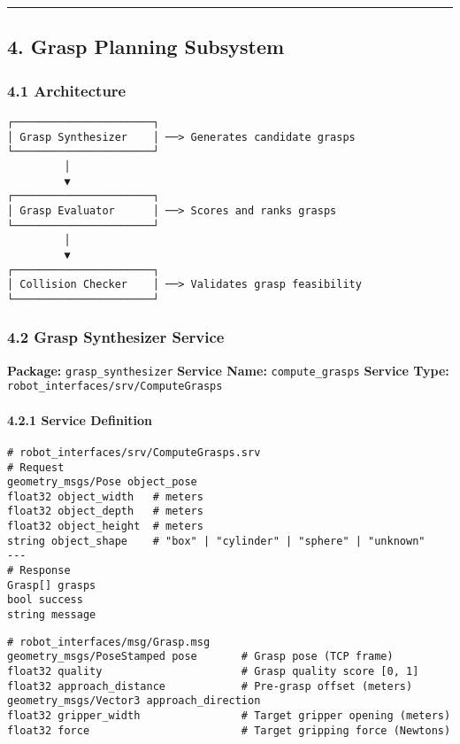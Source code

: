 \documentclass[
]{article}
\begin{document}
\begin{center}\rule{0.5\linewidth}{0.5pt}\end{center}

\hypertarget{grasp-planning-subsystem}{%
\subsection{4. Grasp Planning
Subsystem}\label{grasp-planning-subsystem}}

\hypertarget{architecture-1}{%
\subsubsection{4.1 Architecture}\label{architecture-1}}

\begin{verbatim}
┌──────────────────────┐
│ Grasp Synthesizer    │ ──> Generates candidate grasps
└──────────────────────┘
         │
         ▼
┌──────────────────────┐
│ Grasp Evaluator      │ ──> Scores and ranks grasps
└──────────────────────┘
         │
         ▼
┌──────────────────────┐
│ Collision Checker    │ ──> Validates grasp feasibility
└──────────────────────┘
\end{verbatim}

\hypertarget{grasp-synthesizer-service}{%
\subsubsection{4.2 Grasp Synthesizer
Service}\label{grasp-synthesizer-service}}

\textbf{Package:} \texttt{grasp\_synthesizer} \textbf{Service Name:}
\texttt{compute\_grasps} \textbf{Service Type:}
\texttt{robot\_interfaces/srv/ComputeGrasps}

\hypertarget{service-definition}{%
\paragraph{4.2.1 Service Definition}\label{service-definition}}

\begin{verbatim}
# robot_interfaces/srv/ComputeGrasps.srv
# Request
geometry_msgs/Pose object_pose
float32 object_width   # meters
float32 object_depth   # meters
float32 object_height  # meters
string object_shape    # "box" | "cylinder" | "sphere" | "unknown"
---
# Response
Grasp[] grasps
bool success
string message
\end{verbatim}

\begin{verbatim}
# robot_interfaces/msg/Grasp.msg
geometry_msgs/PoseStamped pose       # Grasp pose (TCP frame)
float32 quality                      # Grasp quality score [0, 1]
float32 approach_distance            # Pre-grasp offset (meters)
geometry_msgs/Vector3 approach_direction
float32 gripper_width                # Target gripper opening (meters)
float32 force                        # Target gripping force (Newtons)
\end{verbatim}
\end{document}
